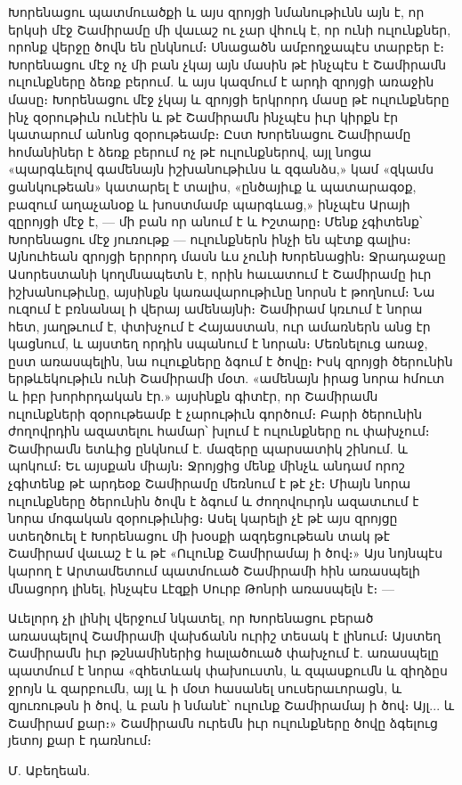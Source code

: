 \documentclass{article}
\begin{document}
{Խորենացու պատմուածքի և այս զրոյցի նմանութիւնն այն է, որ երկսի մէջ Շամիրամը մի վաւաշ ու չար վհուկ է, որ ունի ուլունքներ, որոնք վերջը ծովն են ընկնում։ Սնացածն ամբողջապէս տարբեր է։ Խորենացու մէջ ոչ մի բան չկայ այն մասին թէ ինչպէս է Շամիրամն ուլունքները ձեռք բերում. և այս կազմում է արդի զրոյցի առաջին մասը։ Խորենացու մէջ չկայ և զրոյցի երկրորդ մասը թէ ուլունքները ինչ զօրութիւն ունէին և թէ Շամիրամն ինչպէս իւր կիրքն էր կատարում անոնց զօրութեամբ։ Ըստ Խորենացու Շամիրամը հոմանիներ է ձեռք բերում ոչ թէ ուլունքներով, այլ նոցա «պարգևելով գամենայն իշխանութիւնս և զգանձս,» կամ «զկամս ցանկութեան» կատարել է տալիս, «ընծայիւք և պատարագօք, բազում աղաչանօք և խոստմամբ պարգևաց,» ինչպէս Արայի զըրոյցի մէջ է, — մի բան որ անում է և Իշտարը։ Մենք չգիտենք՝ Խորենացու մէջ յուռութք — ուլունքներն ինչի են պէտք գալիս։ Այնուհեան զրոյցի երրորդ մասն ևս չունի Խորենացին։ Ջրադաջաը Ասորեստանի կողմնապետն է, որին հաւատում է Շամիրամը իւր իշխանութիւնը, այսինքն կառավարութիւնը նորսն է թողնում։ Նա ուզում է բռնանալ ի վերայ ամենայնի։ Շամիրամ կռւում է նորա հետ, յաղթւում է, փտխչում է Հայաստան, ուր ամառներն անց էր կացնում, և այստեղ որդին սպանում է նորան։ Մեռնելուց առաջ, ըստ առասպելին, նա ուլուքները ձգում է ծովը։ Իսկ զրոյցի ծերունին երթևեկութիւն ունի Շամիրամի մօտ. «ամենայն իրաց նորա հմուտ և իբր խորհրդական էր.» այսինքն գիտէր, որ Շամիրամն ուլունքների զօրութեամբ է չարութիւն գործում։ Բարի ծերունին ժողովրդին ազատելու համար՝ խլում է ուլունքները ու փախչում։ Շամիրամն ետևից ընկնում է. մազերը պարսատիկ շինում. և պոկում։ Եւ այսքան միայն։ Ջրոյցից մենք մինչև անդամ որոշ չգիտենք թէ արդեօք Շամիրամը մեռնում է թէ չէ։ Միայն նորա ուլունքները ծերունին ծովն է ձգում և ժողովուրդն ազատւում է նորա մոգական զօրութիւնից։ Ասել կարելի չէ թէ այս զրոյցը ստեղծուել է Խորենացու մի խօսքի ազդեցութեան տակ թէ Շամիրամ վաւաշ է և թէ «Ուլունք Շամիրամայ ի ծով։» Այս նոյնպէս կարող է Արտամետում պատմուած Շամիրամի հին առասպելի մնացորդ լինել, ինչպէս Լէզքի Սուրբ Թոնրի առասպելն է։ —

Աւելորդ չի լինիլ վերջում նկատել, որ Խորենացու բերած առասպելով Շամիրամի վախճանն ուրիշ տեսակ է լինում։ Այստեղ Շամիրամն իւր թշնամիներից հալածուած փախչում է. առասպելը պատմում է նորա «զհետևակ փախուստն, և զպասքումն և զիղձըս ջրոյն և զարբումն, այլ և ի մօտ հասանել սուսերաւորացն, և զյուռութսն ի ծով, և բան ի նմանէ՝ ուլունք Շամիրամայ ի ծով։ Այլ... և Շամիրամ քար։» Շամիրամն ուրեմն իւր ուլունքները ծովը ձգելուց յետոյ քար է դառնում։

\bigskip

Մ. Աբեղեան.}
\clearpage
\end{document}

